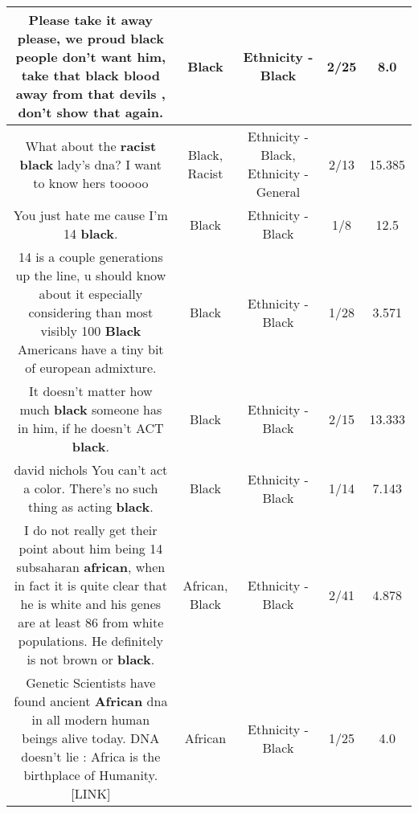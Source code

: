 \documentclass[11pt]{article}
\newlength\mylength
\begin{document}
\begin{center}
\begin{longtable}{|C{.65\mylength}|C{.30\mylength}|C{.12\mylength}|C{.12\mylength}|C{.12\mylength}|}
  \small Please take it away please, we proud \textbf{black} people don't want him, take that \textbf{black} blood away from that devils , don't show that again.\normalsize   & Black & Ethnicity - Black & 2/25 & 8.0 \\  \hline
  \small What about the \textbf{racist} \textbf{black} lady's dna? I want to know hers tooooo\normalsize   & Black, Racist & Ethnicity - Black, Ethnicity - General & 2/13 & 15.385 \\  \hline
  \small You just hate me cause I'm 14 \textbf{black}.\normalsize   & Black & Ethnicity - Black & 1/8 & 12.5 \\  \hline
  \small 14 is a couple generations up the line, u should know about it especially considering than most visibly 100 \textbf{Black} Americans have a tiny bit of european admixture.\normalsize   & Black & Ethnicity - Black & 1/28 & 3.571 \\  \hline
  \small It doesn't matter how much \textbf{black} someone has in him, if he doesn't ACT \textbf{black}.\normalsize   & Black & Ethnicity - Black & 2/15 & 13.333 \\  \hline
  \small david nichols You can't act a color. There's no such thing as acting \textbf{black}.\normalsize   & Black & Ethnicity - Black & 1/14 & 7.143 \\  \hline
  \small I do not really get their point about him being 14 subsaharan \textbf{african}, when in fact it is quite clear that he is white and his genes are at least 86 from white populations.  He definitely is not brown or \textbf{black}.\normalsize   & African, Black & Ethnicity - Black & 2/41 & 4.878 \\  \hline
  \small Genetic Scientists have found ancient \textbf{African} dna in all modern human beings alive today. DNA doesn't lie : Africa is the birthplace of Humanity.  [LINK] \normalsize   & African & Ethnicity - Black & 1/25 & 4.0 \\  \hline

\end{longtable}
\end{center}
\end{document}
